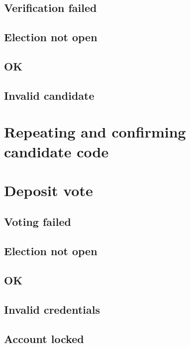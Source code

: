 \subsection{Verification failed}\label{sec9:verification-failed-1}

\subsection{Election not open}\label{sec9:election-not-open-1}

\subsection{OK}\label{sec9:ok-1}

\subsection{Invalid candidate}\label{sec9:invalid-candidate}

\section{Repeating and confirming candidate code}\label{sec9:repe-conf-cand}

\section{Deposit vote}\label{sec9:deposit-vote}

\subsection{Voting failed}\label{sec9:voting-failed}

\subsection{Election not open}\label{sec9:election-not-open-2}

\subsection{OK}\label{sec9:ok-2}

\subsection{Invalid credentials}\label{sec9:invalid-credentials-1}

\subsection{Account locked}\label{sec9:account-locked-1}

